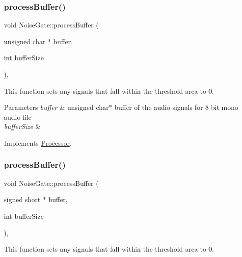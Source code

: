 \subsubsection{\texorpdfstring{process\+Buffer()}{processBuffer()}\hspace{0.1cm}{\footnotesize\ttfamily [1/2]}}
{\footnotesize\ttfamily void Noise\+Gate\+::process\+Buffer (\begin{DoxyParamCaption}\item[{unsigned char $\ast$}]{buffer,  }\item[{int}]{buffer\+Size }\end{DoxyParamCaption})\hspace{0.3cm}{\ttfamily [override]}, {\ttfamily [virtual]}}



This function sets any signals that fall within the threshold area to 0. 


\begin{DoxyParams}{Parameters}
{\em buffer} & unsigned char$\ast$ buffer of the audio signals for 8 bit mono audio file \\
\hline
{\em buffer\+Size} & \\
\hline
\end{DoxyParams}


Implements \hyperlink{classProcessor}{Processor}.

\mbox{\label{classNoiseGate_a7fff3386cd56cb96c60ccec17ec6afd0}} 
\subsubsection{\texorpdfstring{process\+Buffer()}{processBuffer()}\hspace{0.1cm}{\footnotesize\ttfamily [2/2]}}
{\footnotesize\ttfamily void Noise\+Gate\+::process\+Buffer (\begin{DoxyParamCaption}\item[{signed short $\ast$}]{buffer,  }\item[{int}]{buffer\+Size }\end{DoxyParamCaption})\hspace{0.3cm}{\ttfamily [override]}, {\ttfamily [virtual]}}



This function sets any signals that fall within the threshold area to 0. 


